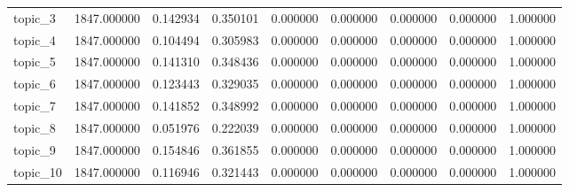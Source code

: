 \begin{tabular}{lrrrrrrrr}
topic_3 & 1847.000000 & 0.142934 & 0.350101 & 0.000000 & 0.000000 & 0.000000 & 0.000000 & 1.000000 \\
topic_4 & 1847.000000 & 0.104494 & 0.305983 & 0.000000 & 0.000000 & 0.000000 & 0.000000 & 1.000000 \\
topic_5 & 1847.000000 & 0.141310 & 0.348436 & 0.000000 & 0.000000 & 0.000000 & 0.000000 & 1.000000 \\
topic_6 & 1847.000000 & 0.123443 & 0.329035 & 0.000000 & 0.000000 & 0.000000 & 0.000000 & 1.000000 \\
topic_7 & 1847.000000 & 0.141852 & 0.348992 & 0.000000 & 0.000000 & 0.000000 & 0.000000 & 1.000000 \\
topic_8 & 1847.000000 & 0.051976 & 0.222039 & 0.000000 & 0.000000 & 0.000000 & 0.000000 & 1.000000 \\
topic_9 & 1847.000000 & 0.154846 & 0.361855 & 0.000000 & 0.000000 & 0.000000 & 0.000000 & 1.000000 \\
topic_10 & 1847.000000 & 0.116946 & 0.321443 & 0.000000 & 0.000000 & 0.000000 & 0.000000 & 1.000000 \\
\bottomrule
\end{tabular}
